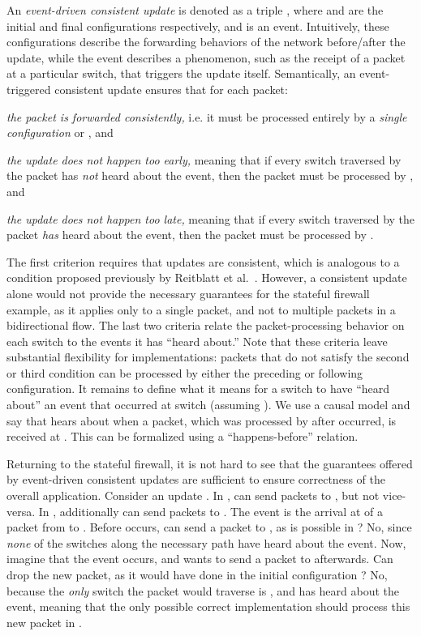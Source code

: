 \documentclass[pldi-cameraready]{sigplanconf}
\begin{document}
An {\em event-driven consistent update} is denoted as a triple 
,
where  and  are the initial and final configurations respectively,
and  is an 
event. Intuitively, these configurations describe the forwarding
behaviors of the network before/after the update, while the event
describes a phenomenon, such as the receipt of a packet at a particular switch,
that triggers the update itself.
Semantically, an event-triggered consistent update ensures that for each packet:
\begin{compactenum}
\item {\em the packet is forwarded consistently,} i.e.
   it must be processed entirely by a {\em single configuration}
   or , and
\item {\em the update does not happen too early,} meaning that if every switch traversed by the packet has {\em not} heard about the event, then the
  packet must be processed by , and
\item {\em the update does not happen too late,} meaning that if every switch traversed by the packet {\em has} heard about the event, then the packet must
  be processed by .
\end{compactenum}
The first criterion requires that updates are consistent, which is
analogous to a condition proposed previously by Reitblatt et
al.~\cite{reitblatt2012abstractions}. However, a consistent update
alone would not provide the  necessary guarantees for the stateful
firewall example, as it applies only to a single packet, and not to
multiple packets in a bidirectional flow. The last two criteria relate
the packet-processing behavior on each switch to the events it has
``heard about.'' Note that these criteria leave substantial
flexibility for implementations: packets that do not satisfy the
second or third condition can be processed by either the preceding or following
configuration. It remains to define what it means for a switch  to
have ``heard about'' an event  that occurred at switch 
(assuming ). We use
a causal model and say that  hears about  when a packet, which
was processed by  after  occurred, is received at . This
can be formalized using a ``happens-before''
relation. 

Returning to the stateful firewall, it is not hard to see that the
guarantees offered by event-driven consistent updates are
sufficient to ensure correctness of the overall
application. Consider an update . 
In ,  can send packets to , but not vice-versa. In
, additionally  can send packets to . The event  is
the arrival at  of a packet from  to .
Before  occurs, can  send a packet to , as is possible in ? No,
since {\em none} of the switches along the necessary path have
heard about the event.
Now, imagine that the
event  occurs, and  wants to send a packet to 
afterwards. Can  drop the new packet, as it would have done in the
initial configuration ? No, because the {\em only} switch the packet would
traverse is , and  has heard about the event, meaning
that the only possible correct implementation should process this new packet in
. 
\end{document}
